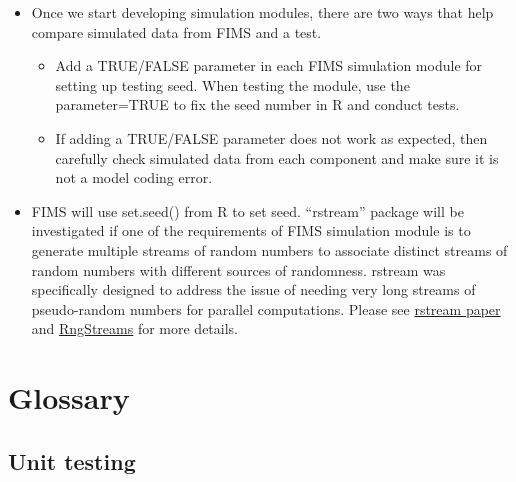 \documentclass[
]{book}
\providecommand{\tightlist}{%
  \setlength{\itemsep}{0pt}\setlength{\parskip}{0pt}}
\begin{document}
\begin{itemize}
\tightlist
\item
  Once we start developing simulation modules, there are two ways that help compare simulated data from FIMS and a test.

  \begin{itemize}
  \tightlist
  \item
    Add a TRUE/FALSE parameter in each FIMS simulation module for setting up testing seed. When testing the module, use the parameter=TRUE to fix the seed number in R and conduct tests.
  \item
    If adding a TRUE/FALSE parameter does not work as expected, then carefully check simulated data from each component and make sure it is not a model coding error.
  \end{itemize}
\item
  FIMS will use set.seed() from R to set seed. ``rstream'' package will be investigated if one of the requirements of FIMS simulation module is to generate multiple streams of random numbers to associate distinct streams of random numbers with different sources of randomness. rstream was specifically designed to address the issue of needing very long streams of pseudo-random numbers for parallel computations. Please see \href{https://www.iro.umontreal.ca/~lecuyer/myftp/papers/rstream.pdf}{rstream paper} and \href{http://www-labs.iro.umontreal.ca/~lecuyer/myftp/streams00/}{RngStreams} for more details.
\end{itemize}

\hypertarget{glossary}{%
\section{Glossary}\label{glossary}}

\hypertarget{unit-testing}{%
\subsection{Unit testing}\label{unit-testing}}
\end{document}
